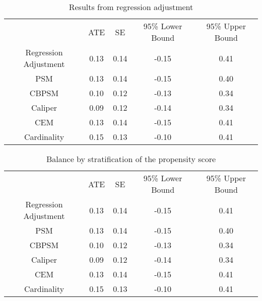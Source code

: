 \begin{table}[t]
\caption{Results from regression adjustment} \label{tbRA4}
\footnotesize
   \centering
{\tabcolsep=16.5pt
\begin{tabular}{c||c|c|c|c}
\hline
     & ATE    & SE    & 95\% Lower Bound & 95\% Upper Bound \\ \hhline{=#=|=|=|=}
Regression Adjustment  & 0.13 & 0.14 & -0.15 & 0.41 \\ \hline
PSM  & 0.13 & 0.14 & -0.15 & 0.40 \\ \hline
CBPSM  & 0.10 & 0.12 & -0.13 & 0.34 \\ \hline
Caliper  & 0.09 & 0.12 & -0.14 & 0.34 \\ \hline
CEM  & 0.13 & 0.14 & -0.15 & 0.41 \\ \hline
Cardinality  & 0.15 & 0.13 & -0.10 & 0.41 \\ \hline
\end{tabular}}
\end{table}

\begin{table}[t]
\caption{Balance by stratification of the propensity score} \label{tbRA5}
\footnotesize
   \centering
{\tabcolsep=16.5pt
\begin{tabular}{c||c|c|c|c}
\hline
     & ATE    & SE    & 95\% Lower Bound & 95\% Upper Bound \\ \hhline{=#=|=|=|=}
Regression Adjustment  & 0.13 & 0.14 & -0.15 & 0.41 \\ \hline
PSM  & 0.13 & 0.14 & -0.15 & 0.40 \\ \hline
CBPSM  & 0.10 & 0.12 & -0.13 & 0.34 \\ \hline
Caliper  & 0.09 & 0.12 & -0.14 & 0.34 \\ \hline
CEM  & 0.13 & 0.14 & -0.15 & 0.41 \\ \hline
Cardinality  & 0.15 & 0.13 & -0.10 & 0.41 \\ \hline
\end{tabular}}
\end{table}
